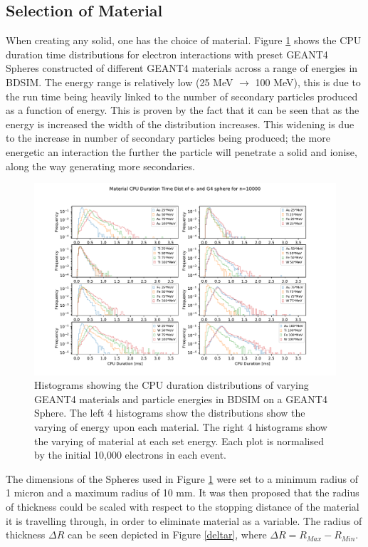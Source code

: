 \documentclass[12pt,a4paper]{article}
\begin{document}
\newpage
\subsection{Selection of Material}
When creating any solid, one has the choice of material. Figure \ref{novar} shows the CPU duration time distributions for electron interactions with preset GEANT4 Spheres constructed of different GEANT4 materials across a range of energies in BDSIM. The energy range is relatively low (25 MeV $\rightarrow$ 100 MeV), this is due to the run time being heavily linked to the number of secondary particles produced as a function of energy. This is proven by the fact that it can be seen that as the energy is increased the width of the distribution increases. This widening is due to the increase in number of secondary particles being produced; the more energetic an interaction the further the particle will penetrate a solid and ionise, along the way generating more secondaries.
\begin{figure}[h!]
\centering
\includegraphics[scale=0.6]{Images//Materials//not_Varied_by_radius_and_secondaries.pdf}
\caption[width=\columnwidth]{Histograms showing the CPU duration distributions of varying GEANT4 materials and particle energies in BDSIM on a GEANT4 Sphere. The left 4 histograms show the distributions show the varying of energy upon each material. The right 4 histograms show the varying of material at each set energy. Each plot is normalised by the initial 10,000 electrons in each event.}
\label{novar}
\end{figure}
\newpage
\noindent The dimensions of the Spheres used in Figure \ref{novar} were set to a minimum radius of 1 micron and a maximum radius of 10 mm. It was then proposed that the radius of thickness could be scaled with respect to the stopping distance of the material it is travelling through, in order to eliminate material as a variable. The radius of thickness $\Delta R$ can be seen depicted in Figure \ref{deltar}, where $\Delta R = R_{Max} - R_{Min}$.
\end{document}
